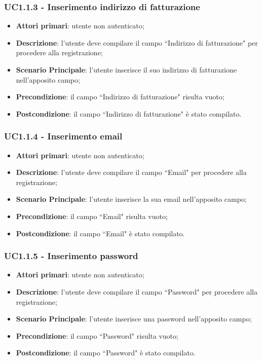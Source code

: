 \subsubsection{UC1.1.3 - Inserimento indirizzo di fatturazione}
\begin{itemize}
\item \textbf{Attori primari}: utente non autenticato;
\item \textbf{Descrizione}: l'utente deve compilare il campo ``Indirizzo di fatturazione" per procedere alla registrazione;
\item \textbf{Scenario Principale}: l'utente inserisce il suo indirizzo di fatturazione nell'apposito campo;
\item \textbf{Precondizione}: il campo ``Indirizzo di fatturazione" risulta vuoto;
\item \textbf{Postcondizione}: il campo ``Indirizzo di fatturazione" è stato compilato.
\end{itemize}

\subsubsection{UC1.1.4 - Inserimento email}
\begin{itemize}
\item \textbf{Attori primari}: utente non autenticato;
\item \textbf{Descrizione}: l'utente deve compilare il campo ``Email" per procedere alla registrazione;
\item \textbf{Scenario Principale}: l'utente inserisce la sua email nell'apposito campo;
\item \textbf{Precondizione}: il campo ``Email" risulta vuoto;
\item \textbf{Postcondizione}: il campo ``Email" è stato compilato.
\end{itemize}

\subsubsection{UC1.1.5 - Inserimento password}
\begin{itemize}
\item \textbf{Attori primari}: utente non autenticato;
\item \textbf{Descrizione}: l'utente deve compilare il campo ``Password" per procedere alla registrazione;
\item \textbf{Scenario Principale}: l'utente inserisce una password nell'apposito campo;
\item \textbf{Precondizione}: il campo ``Password" risulta vuoto;
\item \textbf{Postcondizione}: il campo ``Password" è stato compilato.
\end{itemize}

